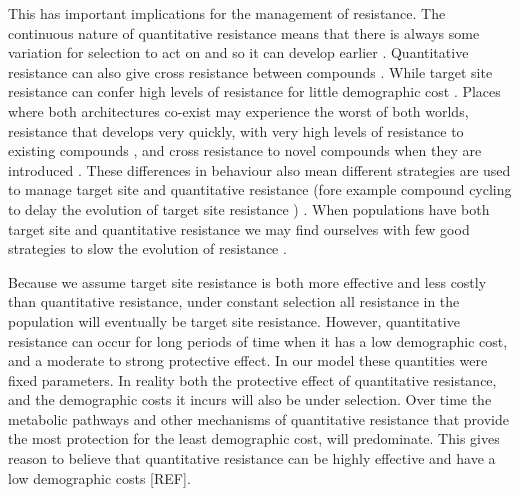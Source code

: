 \documentclass[10pt,letterpaper]{article}
\begin{document}
This has important implications for the management of resistance. The continuous nature of quantitative resistance means that there is always some variation for selection to act on and so it can develop earlier \cite{Dely2010newPhy}. Quantitative resistance can also give cross resistance between compounds \cite{Bauc2016, Neve2007}. While target site resistance can confer high levels of resistance for little demographic cost \cite{Bauc2016}. Places where both architectures co-exist may experience the worst of both worlds, resistance that develops very quickly, with very high levels of resistance to existing compounds \cite{Vera2015}, and cross resistance to novel compounds when they are introduced \cite{Neve2007}. These differences in behaviour also mean different strategies are used to manage target site and quantitative resistance (fore example compound cycling to delay the evolution of target site resistance \cite{Rex2013}) \cite{Gard1998}. When populations have both target site and quantitative resistance we may find ourselves with few good strategies to slow the evolution of resistance \cite{Gard1998}. 

Because we assume target site resistance is both more effective and less costly than quantitative resistance, under constant selection all resistance in the population will eventually be target site resistance. However, quantitative resistance can occur for long periods of time when it has a low demographic cost, and a moderate to strong protective effect. In our model these quantities were fixed parameters. In reality both the protective effect of quantitative resistance, and the demographic costs it incurs will also be under selection. Over time the metabolic pathways and other mechanisms of quantitative resistance that provide the most protection for the least demographic cost, will predominate. This gives reason to believe that quantitative resistance can be highly effective and have a low demographic costs [REF].    
\end{document}
